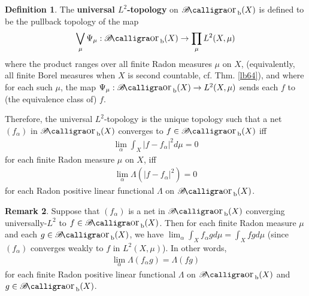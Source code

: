 \documentclass[12pt,b5paper,notitlepage]{article}
\theoremstyle{definition}
\newtheorem{df}{Definition}[subsection]
\newtheorem{rem}[df]{Remark}
\theoremstyle{plain}
\DeclareMathOperator{\Borb}{{\mathscr{B}\text{\kern -2pt {\calligra\large or}}\,}_{\mathrm b}}
\newcommand{\hqed}{\hfill\qedsymbol}
\numberwithin{equation}{section}
\begin{document}
\begin{df}\label{lb563}
The \textbf{universal $L^2$-topology}  on $\Borb(X)$ is defined to be the pullback topology of the map
\begin{align*}
\bigvee_\mu \Psi_\mu:\Borb(X)\rightarrow \prod_\mu L^2(X,\mu)
\end{align*}
where the product ranges over all finite Radon measures $\mu$ on $X$, (equivalently, all finite Borel measures when $X$ is second countable, cf. Thm. \ref{lb64}), and where for each such $\mu$, the map $\Psi_\mu:\Borb(X)\rightarrow L^2(X,\mu)$ sends each $f$ to (the equivalence class of) $f$.

Therefore, the universal $L^2$-topology is the unique topology such that a net $(f_\alpha)$ in $\Borb(X)$ converges to $f\in\Borb(X)$ iff
\begin{align*}
\lim_\alpha \int_X|f-f_\alpha|^2d\mu=0
\end{align*}
for each finite Radon measure $\mu$ on $X$, iff
\begin{align*}
\lim_\alpha\Lambda(|f-f_\alpha|^2)=0
\end{align*}
for each Radon positive linear functional $\Lambda$ on $\Borb(X)$. \hqed
\end{df}

\begin{rem}\label{lb277}
Suppose that $(f_\alpha)$ is a net in $\Borb(X)$ converging universally-$L^2$ to $f\in\Borb(X)$. Then for each finite Radon measure $\mu$ and each $g\in\Borb(X)$, we have $\lim_\alpha\int_X f_\alpha g d\mu=\int_Xf gd\mu$ (since $(f_\alpha)$ converges weakly to $f$ in $L^2(X,\mu)$). In other words,
\begin{align}
\lim_\alpha\Lambda(f_\alpha g)=\Lambda(fg)
\end{align}
for each finite Radon positive linear functional $\Lambda$ on $\Borb(X)$ and $g\in\Borb(X)$. 
\end{rem}
\end{document}
